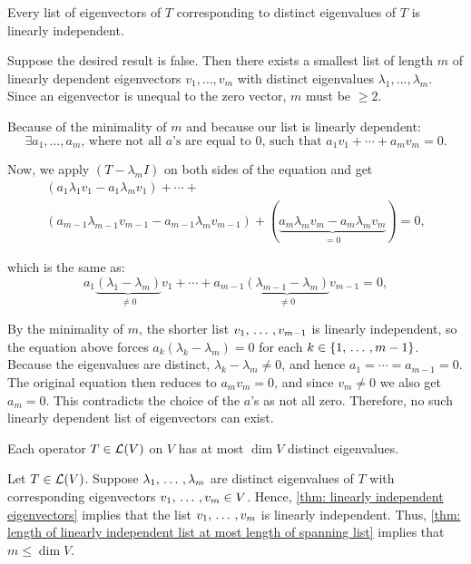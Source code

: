 \setcounter{thm}{10}
\begin{thm}
  \label{thm: linearly independent eigenvectors}
  Every list of eigenvectors of $T$ corresponding to distinct eigenvalues of $T$ is linearly independent.
\end{thm}
\begin{prf}
  Suppose the desired result is false. Then there exists a smallest list of length $m$ of linearly dependent eigenvectors $v_1, \dots, v_m$ with distinct eigenvalues $\lambda_1, \dots, \lambda_m$. Since an eigenvector is unequal to the zero vector, $m$ must be $\geq 2$.

  Because of the minimality of $m$ and because our list is linearly dependent:
  \begin{equation}
    \exists a_1, \dots, a_m\text{, where not all $a$'s are equal to }0\text{, such that } a_1 v_1 + \cdots + a_m v_m = 0.
  \end{equation}

  Now, we apply $(T-\lambda_m I)$ on both sides of the equation and get
  \begin{equation}
    \begin{gathered}
      (a_1 \lambda_1 v_1 - a_1 \lambda_m v_1)
      + \cdots + \\
      (a_{m-1} \lambda_{m-1} v_{m-1} - a_{m-1} \lambda_{m} v_{m-1}) +
      (\underbrace{a_m \lambda_m v_m -a_m \lambda_m v_m}_{=0}) =0,
    \end{gathered}
  \end{equation}

  which is the same as:
  \begin{equation}
    a_1 \underbrace{(\lambda_1 - \lambda_m)}_{\neq 0} v_1 + \cdots + a_{m-1} \underbrace{(\lambda_{m-1}-\lambda_{m})}_{\neq 0} v_{m-1}=0,
  \end{equation}

  By the minimality of $m$, the shorter list $v_1, {\, \ldots \,\,}, v_{m-1}$ is linearly independent, so the equation above forces $a_k(\lambda_k - \lambda_m) = 0$ for each $k \in \{1, {\, \ldots \,\,}, m-1\}$. Because the eigenvalues are distinct, $\lambda_k - \lambda_m \neq 0$, and hence $a_1 = \cdots = a_{m-1} = 0$. The original equation then reduces to $a_m v_m = 0$, and since $v_m \neq 0$ we also get $a_m = 0$. This contradicts the choice of the $a$'s as not all zero. Therefore, no such linearly dependent list of eigenvectors can exist.
\end{prf}

\begin{thm}
  \label{thm: operator cannot have more eigenvalues than dimension of vector space}
  Each operator $T \in \mathcal{L}(V)$ on $V$ has at most $\dim V$ distinct eigenvalues.
\end{thm}
\begin{prf}
  Let $T \in \mathcal{L}(V)$. Suppose $\lambda_1, {\, \ldots \,\,}, \lambda_m$ are distinct eigenvalues of $T$ with corresponding eigenvectors $v_1, {\, \ldots \,\,}, v_m \in V$. Hence, \ref{thm: linearly independent eigenvectors} implies that the list $v_1, {\, \ldots \,\,}, v_m$ is linearly independent. Thus, \ref{thm: length of linearly independent list at most length of spanning list}
  implies that $m \leq \dim V$.
\end{prf}


